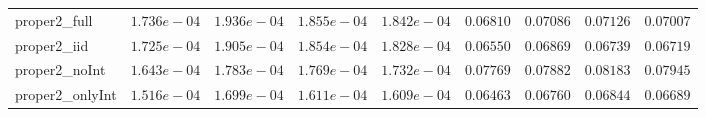 \begin{table}
\begin{tabular}{lcccccccc}
proper2_full  & $1.736e-04$ & $1.936e-04$ & $1.855e-04$ & $1.842e-04$ & $0.06810$ & $0.07086$ & $0.07126$ & $0.07007$ \\
proper2_iid  & $1.725e-04$ & $1.905e-04$ & $1.854e-04$ & $1.828e-04$ & $0.06550$ & $0.06869$ & $0.06739$ & $0.06719$ \\
proper2_noInt  & $1.643e-04$ & $1.783e-04$ & $1.769e-04$ & $1.732e-04$ & $0.07769$ & $0.07882$ & $0.08183$ & $0.07945$ \\
proper2_onlyInt  & $1.516e-04$ & $1.699e-04$ & $1.611e-04$ & $1.609e-04$ & $0.06463$ & $0.06760$ & $0.06844$ & $0.06689$ \\
\hline 
\end{tabular}


\end{table}